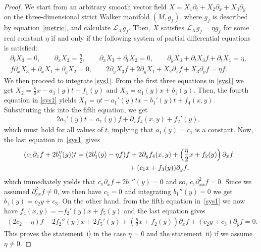 \documentclass[10pt,a4paper]{amsart}
\numberwithin{equation}{section}
\begin{document}
\begin{proof}
We start from an arbitrary smooth vector f\/ield $X=X_1\partial_t+X_2\partial_x+X_3\partial_y$ on the three-dimensional strict Walker manifold $(M,g_f)$, where $g_f$ is described by equation~\eqref{metric}, and calculate $\mathcal L_Xg_f$. Then, $X$ satisf\/ies $\mathcal L_Xg_f=\eta g_f$ for some real constant $\eta$ if and only if the following system of partial dif\/ferential equations is satisf\/ied:
\begin{gather}
\partial_tX_3=0,\qquad \partial_xX_2=\frac\eta2,\qquad \partial_xX_3+\partial_tX_2=0,\qquad
\partial_yX_3+\partial_t X_3f+\partial_tX_1=\eta,\nonumber\\
 f\partial_xX_3+\partial_xX_1+\partial_yX_2=0,\qquad 2\partial_yX_3f+2\partial_yX_1+X_2\partial_xf+X_3\partial_yf=\eta f.\label{sys1}
\end{gather}
We then proceed to integrate \eqref{sys1}. From the f\/irst three equations in \eqref{sys1} we get $X_2=\frac\eta2x-a_1(y)t+f_1(y)$ and $X_3=a_1(y)x+b_1(y)$. Then, the fourth equation in \eqref{sys1} yields $X_1=\eta t-a_1 '(y) tx-b_1 '(y)t+f_4(x,y)$. Substituting this into the f\/ifth equation, we get
\begin{gather*}2a_1 '(y)t=a_1(y)f+\partial_xf_4(x,y)+f_2 '(y),\end{gather*}
which must hold for all values of $t${, implying} that $a_1(y)=c_1$ is a constant. Now, the last equation in~\eqref{sys1} gives
\begin{gather*}
(c_1\partial_xf+2b_1 ''(y))t =(2b_1 '(y)-\eta f)f+2\partial_yf_4(x,y)+\left(\frac\eta2 x+f_2(y)\right)\partial_xf \\
\hphantom{(c_1\partial_xf+2b_1 ''(y))t =}{} +(c_1x+f_3(y))\partial_yf,
\end{gather*}
which immediately yields that $c_1\partial_xf+2b_1 ''(y)=0$ and so, $c_1\partial_{xx}^2f=0$. Since we assumed $\partial_{xx}^2f\neq 0$, we then have $c_1=0$ and integrating $b_1 ''(y)=0$ we get $b_1(y)=c_2y+c_3$. On the other hand, from the f\/ifth equation in~\eqref{sys1} we now have $f_4(x,y)=-f_2 '(y)x+f_5(y)$ and the last equation gives
\begin{gather*}
(2c_2-\eta)f-2f_2 ''(y)x+2f_5 '(y)+\left(\frac\eta2 x+f_2(y)\right)\partial_xf+(c_2y+c_3)\partial_yf=0.
\end{gather*}
This proves the statement~i) in the case $\eta=0$ and the statement~ii) if we assume $\eta \neq 0$.


\end{proof}
\end{document}
